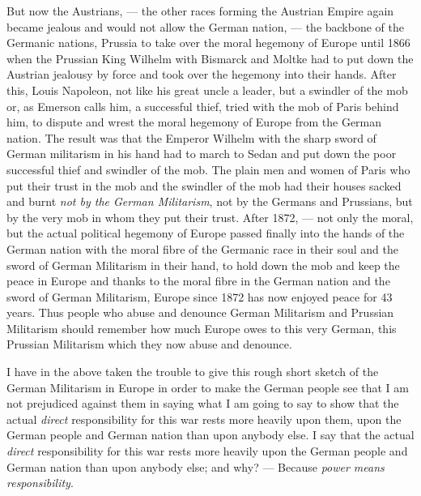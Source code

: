 But now the Austrians, --- the other races forming the Austrian Empire again became jealous and would not allow the German nation, --- the backbone of the Germanic nations, Prussia to take over the moral hegemony of Europe until 1866 when the Prussian King Wilhelm with Bismarck and Moltke had to put down the Austrian jealousy by force and took over the hegemony into their hands.
After this, Louis Napoleon, not like his great uncle a leader, but a swindler of the mob or, as Emerson calls him, a successful thief, tried with the mob of Paris behind him, to dispute and wrest the moral hegemony of Europe from the German nation.
The result was that the Emperor Wilhelm with the sharp sword of German militarism in his hand had to march to Sedan and put down the poor successful thief and swindler of the mob.
The plain men and women of Paris who put their trust in the mob and the swindler of the mob had their houses sacked and burnt \emph{not by the German Militarism}, not by the Germans and Prussians, but by the very mob in whom they put their trust.
After 1872, --- not only the moral, but the actual political hegemony of Europe passed finally into the hands of the German nation with the moral fibre of the Germanic race in their soul and the sword of German Militarism in their hand, to hold down the mob and keep the peace in Europe and thanks to the moral fibre in the German nation and the sword of German Militarism, Europe since 1872 has now enjoyed peace for 43 years.
Thus people who abuse and denounce German Militarism and Prussian Militarism should remember how much Europe owes to this very German, this Prussian Militarism which they now abuse and denounce.

I have in the above taken the trouble to give this rough short sketch of the German Militarism in Europe in order to make the German people see that I am not prejudiced against them in saying what I am going to say to show that the actual \emph{direct} responsibility for this war rests more heavily upon them, upon the German people and German nation than upon anybody else.
I say that the actual \emph{direct} responsibility for this war rests more heavily upon the German people and German nation than upon anybody else; and why? --- Because \emph{power means responsibility}\cite{num7}. 

